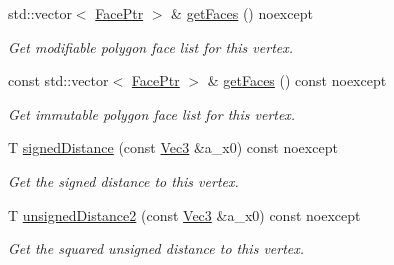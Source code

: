 \begin{DoxyCompactItemize}
\mbox{\label{classDcel_1_1VertexT_a1d365de69778aa4bb35f80c936e95251}} 
std\+::vector$<$ \hyperlink{classDcel_1_1VertexT_a5acb4c66c49319683c71f52e56ad8e8a}{Face\+Ptr} $>$ \& \hyperlink{classDcel_1_1VertexT_a1d365de69778aa4bb35f80c936e95251}{get\+Faces} () noexcept
\begin{DoxyCompactList}\small\item\em Get modifiable polygon face list for this vertex. \end{DoxyCompactList}\item 
\mbox{\label{classDcel_1_1VertexT_aa73d20542e46c20afba1f14cd061f126}} 
const std\+::vector$<$ \hyperlink{classDcel_1_1VertexT_a5acb4c66c49319683c71f52e56ad8e8a}{Face\+Ptr} $>$ \& \hyperlink{classDcel_1_1VertexT_aa73d20542e46c20afba1f14cd061f126}{get\+Faces} () const noexcept
\begin{DoxyCompactList}\small\item\em Get immutable polygon face list for this vertex. \end{DoxyCompactList}\item 
T \hyperlink{classDcel_1_1VertexT_afce7ba8e2bbf81b158b43af2576c4dda}{signed\+Distance} (const \hyperlink{classDcel_1_1VertexT_a6e073dc7426756edef5594816be6e7c7}{Vec3} \&a\+\_\+x0) const noexcept
\begin{DoxyCompactList}\small\item\em Get the signed distance to this vertex. \end{DoxyCompactList}\item 
T \hyperlink{classDcel_1_1VertexT_a552b7d88dfe80c76561b5a002ddc176b}{unsigned\+Distance2} (const \hyperlink{classDcel_1_1VertexT_a6e073dc7426756edef5594816be6e7c7}{Vec3} \&a\+\_\+x0) const noexcept
\begin{DoxyCompactList}\small\item\em Get the squared unsigned distance to this vertex. \end{DoxyCompactList}\end{DoxyCompactItemize}
